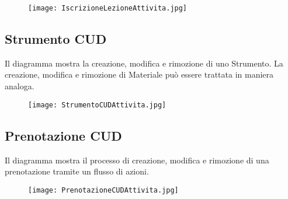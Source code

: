 \documentclass[11pt,a4paper]{report}
\begin{document}
\begin{figure}[h!]
  \centering
  \texttt{[image: IscrizioneLezioneAttivita.jpg]}
\end{figure}
\newpage

\subsection{Strumento CUD}
Il diagramma mostra la creazione, modifica e rimozione di uno Strumento. La creazione, modifica e rimozione di Materiale può essere trattata in maniera analoga.

\begin{figure}[h!]
  \centering
  \texttt{[image: StrumentoCUDAttivita.jpg]}
\end{figure}
\newpage

\subsection{Prenotazione CUD}
Il diagramma mostra il processo di creazione, modifica e rimozione di una prenotazione tramite un flusso di azioni. 

\begin{figure}[h!]
  \centering
  \texttt{[image: PrenotazioneCUDAttivita.jpg]}
\end{figure}
\newpage
\end{document}
